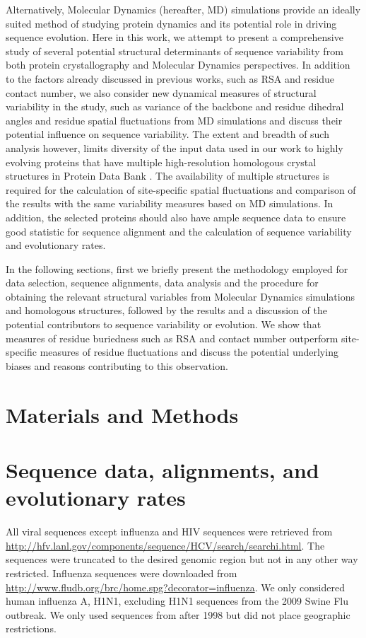 \documentclass[12pt]{article}
\begin{document}
Alternatively, Molecular Dynamics (hereafter, MD) simulations provide an ideally suited method of studying protein dynamics and its potential role in driving sequence evolution.  Here in this work, we attempt to present a comprehensive study of several potential structural determinants of sequence variability from both protein crystallography and Molecular Dynamics perspectives. In addition to the factors already discussed in previous works, such as RSA and residue contact number, we also consider new dynamical measures of structural variability in the study, such as variance of the backbone and residue dihedral angles and residue spatial fluctuations from MD simulations and discuss their potential influence on sequence variability. The extent and breadth of such analysis however, limits diversity of the input data used in our work to highly evolving proteins that have multiple high-resolution homologous crystal structures in Protein Data Bank \citep{berman_protein_2008}. The availability of multiple structures is required for the calculation of site-specific spatial fluctuations and comparison of the results with the same variability measures based on MD simulations. In addition, the selected proteins should also have ample sequence data to ensure good statistic for sequence alignment and the calculation of sequence variability and evolutionary rates.
	
In the following sections, first we briefly present the methodology employed for data selection, sequence alignments, data analysis and the procedure for obtaining the relevant structural variables from Molecular Dynamics simulations and homologous structures, followed by the results and a discussion of the potential contributors to sequence variability or evolution. We show that measures of residue buriedness such as RSA and contact number outperform site-specific measures of residue fluctuations and discuss the potential underlying biases and reasons contributing to this observation.

\section*{Materials and Methods}

\section*{Sequence data, alignments, and evolutionary rates}

All viral sequences except influenza and HIV sequences were retrieved from \url{http://hfv.lanl.gov/components/sequence/HCV/search/searchi.html}.
The sequences were truncated to the desired genomic region but not in any other way restricted. Influenza sequences were downloaded from \url{http://www.fludb.org/brc/home.spg?decorator=influenza}. We only considered human influenza A, H1N1, excluding H1N1 sequences from the 2009 Swine Flu outbreak. We only used sequences from after 1998 but did not place geographic restrictions.
\end{document}
